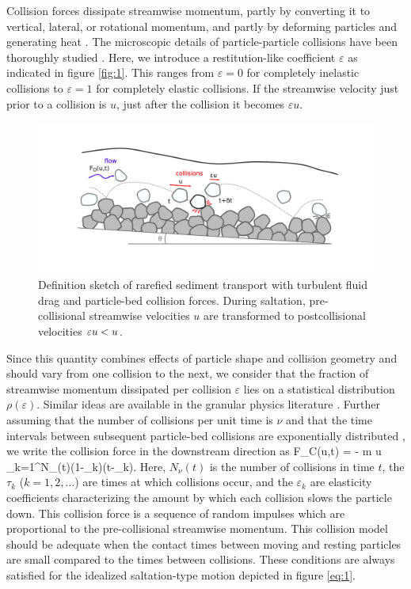 Collision forces dissipate streamwise momentum, partly by converting it to vertical, lateral, or rotational momentum, and partly by deforming particles and generating heat \citep{Williams2021}.
The microscopic details of particle-particle collisions have been thoroughly studied \citep{Brach1989, Lorenz1997,Montaine2011}. Here, we introduce a restitution-like coefficient $\varepsilon$ as indicated in figure \ref{fig:1}. This ranges from $\varepsilon=0$ for completely inelastic collisions to $\varepsilon=1$ for completely elastic collisions.
If the streamwise velocity just prior to a collision is $u$, just after the collision it becomes $\varepsilon u$. 
\begin{figure}
	\centerline{\includegraphics{./figures/ch5/Fig1Concept.png}}
	\caption{Definition sketch of rarefied sediment transport with turbulent fluid drag and particle-bed collision forces. During saltation, pre-collisional streamwise velocities $u$ are transformed to postcollisional velocities $\varepsilon u < u$.}
	\label{fig:fig1}
\end{figure}
Since this quantity combines effects of particle shape and collision geometry and should vary from one collision to the next, we consider that the fraction of streamwise momentum dissipated per collision $\varepsilon$ lies on a statistical distribution $\rho(\varepsilon)$.
Similar ideas are available in the granular physics literature \citep{Serero2015}.
Further assuming that the number of collisions per unit time is $\nu$ and that the time intervals between subsequent particle-bed collisions are exponentially distributed \citep{Gordon1972}, we write the collision force in the downstream direction as
\be F_C(u,t) = - m u \sum_{k=1}^{N_\nu(t)}(1-\varepsilon_k)\delta(t-\tau_k). \label{eq:col} \ee
Here, $N_\nu(t)$ is the number of collisions in time $t$, the $\tau_k$ ($k=1,2,\dots$) are times at which collisions occur, and the $\varepsilon_k$ are elasticity coefficients characterizing the amount by which each collision slows the particle down.
This collision force is a sequence of random impulses which are proportional to the pre-collisional streamwise momentum. This collision model should be adequate when the contact times between moving and resting particles are small compared to the times between collisions. These conditions are always satisfied for the idealized saltation-type motion depicted in figure \ref{eq:1}.

